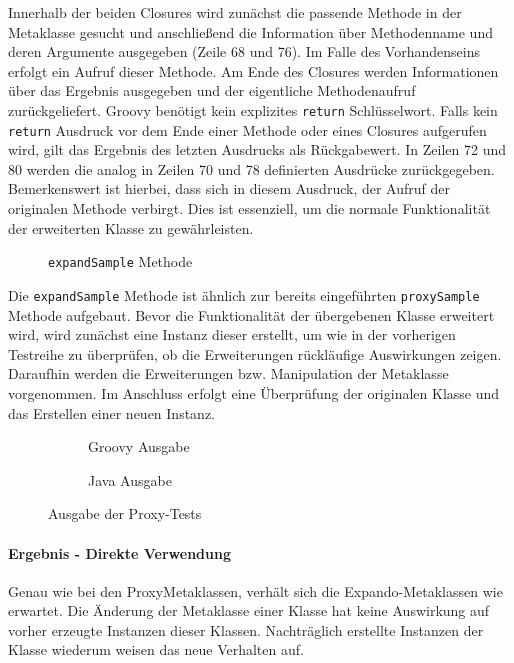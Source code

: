Innerhalb der beiden Closures wird zunächst die passende Methode in der Metaklasse gesucht und anschließend die Information über Methodenname und deren Argumente ausgegeben (Zeile 68 und 76). 
Im Falle des Vorhandenseins erfolgt ein Aufruf dieser Methode.
Am Ende des Closures werden Informationen über das Ergebnis ausgegeben und der eigentliche Methodenaufruf zurückgeliefert. 
Groovy benötigt kein explizites \texttt{return} Schlüsselwort.
Falls kein \texttt{return} Ausdruck vor dem Ende einer Methode oder eines Closures aufgerufen wird, gilt das Ergebnis des letzten Ausdrucks als Rückgabewert. 
In Zeilen 72 und 80 werden die analog in Zeilen 70 und 78 definierten Ausdrücke zurückgegeben. 
Bemerkenswert ist hierbei, dass sich in diesem Ausdruck, der Aufruf der originalen Methode verbirgt.
Dies ist essenziell, um die normale Funktionalität der erweiterten Klasse zu gewährleisten.


\begin{figure}[hbt!]
	
	\caption{\texttt{expandSample} Methode}
	\label{fig:Metatester-expandSample}
\end{figure}


Die \texttt{expandSample} Methode ist ähnlich zur bereits eingeführten \texttt{proxySample} Methode aufgebaut. 
Bevor die Funktionalität der übergebenen Klasse erweitert wird, wird zunächst eine Instanz dieser erstellt, um wie in der vorherigen Testreihe zu überprüfen, ob die Erweiterungen rückläufige Auswirkungen zeigen. 
Daraufhin werden die Erweiterungen bzw. Manipulation der Metaklasse vorgenommen. 
Im Anschluss erfolgt eine Überprüfung der originalen Klasse und das Erstellen einer neuen Instanz.


\begin{figure}[hbt!]
	\begin{subfigure}{\textwidth}
		
		\caption{Groovy Ausgabe}
	\end{subfigure}
	
	\begin{subfigure}{\textwidth}
		
		\caption{Java Ausgabe}
	\end{subfigure}
	
	\caption{Ausgabe der Proxy-Tests}
	\label{fig:proxy-out}
\end{figure}


\paragraph{Ergebnis - Direkte Verwendung}
Genau wie bei den ProxyMetaklassen, verhält sich die Expando-Metaklassen wie erwartet.
Die Änderung der Metaklasse einer Klasse hat keine Auswirkung auf vorher erzeugte Instanzen dieser Klassen.
Nachträglich erstellte Instanzen der Klasse wiederum weisen das neue Verhalten auf.

